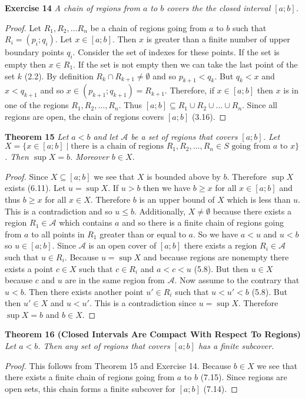 \documentclass{article}
\begin{document}
\begin{flushleft}
\textbf{Exercise 14}
\textsl{A chain of regions from $a$ to $b$ covers the the closed interval $[a;b]$.}
\begin{proof}
Let $R_1,R_2, \dots R_n$ be a chain of regions going from $a$ to $b$ such that $R_i=(p_i;q_i)$. Let $x \in [a;b]$. Then $x$ is greater than a finite number of upper boundary points $q_i$. Consider the set of indexes for these points. If the set is empty then $x \in R_1$. If the set is not empty then we can take the last point of the set $k$ (2.2). By definition $R_k \cap R_{k+1} \neq \emptyset$ and so $p_{k+1} < q_k$. But $q_k<x$ and $x<q_{k+1}$ and so $x \in (p_{k+1};q_{k+1})=R_{k+1}$. Therefore, if $x \in [a;b]$ then $x$ is in one of the regions $R_1,R_2, \dots ,R_n$. Thus $[a;b] \subseteq R_1 \cup R_2 \cup \dots \cup R_n$. Since all regions are open, the chain of regions covers $[a;b]$ (3.16).
\end{proof}

\textbf{Theorem 15}
\textsl{Let $a<b$ and let $\mathcal{A}$ be a set of regions that covers $[a;b]$. Let $X = \{ x \in [a;b] \mid \text{there is a chain of regions } R_1, R_2, \dots ,R_n \in S \text{ going from } a \text{ to } x \}$. Then $\sup X = b$. Moreover $b \in X$.}
\begin{proof}
Since $X \subseteq [a;b]$ we see that $X$ is bounded above by $b$. Therefore $\sup X$ exists (6.11). Let $u = \sup X$. If $u > b$ then we have $b \geq x$ for all $x \in [a;b]$ and thus $b \geq x$ for all $x \in X$. Therefore $b$ is an upper bound of $X$ which is less than $u$. This is a contradiction and so $u \leq b$. Additionally, $X \neq \emptyset$ because there exists a region $R_1 \in \mathcal{A}$ which contains $a$ and so there is a finite chain of regions going from $a$ to all points in $R_1$ greater than or equal to $a$. So we have $a<u$ and $u<b$ so $u \in [a;b]$. Since $\mathcal{A}$ is an open cover of $[a;b]$ there exists a region $R_i \in \mathcal{A}$ such that $u \in R_i$. Because $u = \sup X$ and because regions are nonempty there exists a point $c \in X$ such that $c \in R_i$ and $a<c<u$ (5.8). But then $u \in X$ because $c$ and $u$ are in the same region from $\mathcal{A}$. Now assume to the contrary that $u<b$. Then there exists another point $u' \in R_i$ such that $u<u'<b$ (5.8). But then $u' \in X$ and $u<u'$. This is a contradiction since $u = \sup X$. Therefore $\sup X = b$ and $b \in X$.
\end{proof}

\textbf{Theorem 16 (Closed Intervals Are Compact With Respect To Regions)}
\textsl{Let $a<b$. Then any set of regions that covers $[a;b]$ has a finite subcover.}
\begin{proof}
This follows from Theorem 15 and Exercise 14. Because $b \in X$ we see that there exists a finite chain of regions going from $a$ to $b$ (7.15). Since regions are open sets, this chain forms a finite subcover for $[a;b]$ (7.14).
\end{proof}


\end{flushleft}
\end{document}
